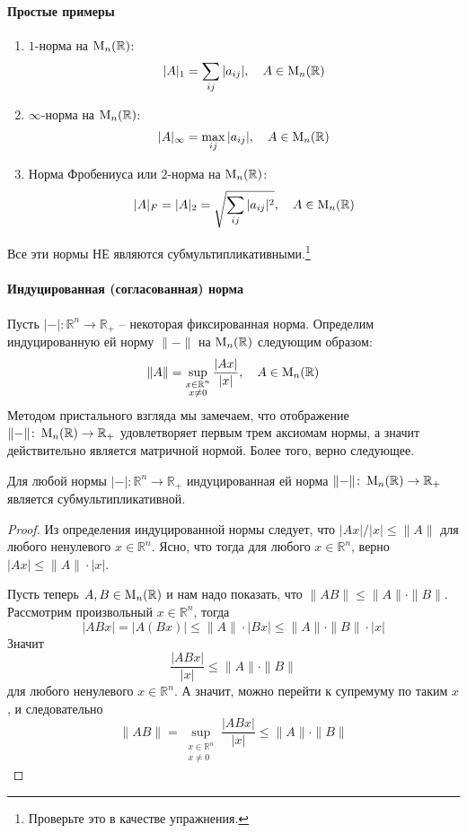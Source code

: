 \paragraph{Простые примеры}
\begin{enumerate}
\item $1$-норма на $\operatorname{M}_{n}(\mathbb R)$:
\[
|A|_1 = \sum_{ij}|a_{ij}|,\quad A\in\operatorname{M}_{n}(\mathbb R)
\]

\item $\infty$-норма на $\operatorname{M}_{n}(\mathbb R)$:
\[
|A|_\infty = \max_{ij}|a_{ij}|,\quad A\in\operatorname{M}_{n}(\mathbb R)
\]

\item Норма Фробениуса или $2$-норма на $\operatorname{M}_{n}(\mathbb R)$:
\[
|A|_F = |A|_2 = \sqrt{\sum_{ij}|a_{ij}|^2},\quad A\in\operatorname{M}_{n}(\mathbb R)
\]
\end{enumerate}


Все эти нормы НЕ являются субмультипликативными.\footnote{Проверьте это в качестве упражнения.}


\paragraph{Индуцированная (согласованная) норма}

Пусть $|{-}|\colon \mathbb R^n \to \mathbb R_+$ -- некоторая фиксированная норма. Определим индуцированную ей норму $\|{-}\|$ на $\operatorname{M}_{n}(\mathbb R)$ следующим образом:
\[
\|A\| = \sup_{\substack{x\in\mathbb R^n\\x\neq 0}}\frac{|Ax|}{|x|},\quad A\in\operatorname{M}_{n}(\mathbb R)
\]
Методом пристального взгляда мы замечаем, что отображение $\|{-}\|\colon \operatorname{M}_{n}(\mathbb R)\to \mathbb R_+$ удовлетворяет первым трем аксиомам нормы, а значит действительно является матричной нормой. Более того, верно следующее.

\begin{claim*}
Для любой нормы $|{-}|\colon \mathbb R^n\to \mathbb R_+$ индуцированная ей норма $\|{-}\|\colon \operatorname{M}_{n}(\mathbb R)\to \mathbb R_+$ является субмультипликативной.
\end{claim*}
\begin{proof}
Из определения индуцированной нормы следует, что $|Ax|/|x|\leqslant \|A\|$ для любого ненулевого $x\in\mathbb R^n$. Ясно, что тогда для любого $x\in\mathbb R^n$, верно $|Ax|\leqslant \|A\|\cdot|x|$. 

Пусть теперь $A, B\in\operatorname{M}_{n}(\mathbb R)$ и нам надо показать, что $\|AB\|\leqslant \|A\|\cdot \|B\|$. Рассмотрим произвольный $x\in\mathbb R^n$, тогда
\[
|ABx| = |A (Bx)|\leqslant \|A\|\cdot |Bx|\leqslant \|A\| \cdot \|B\|\cdot |x|
\]
Значит
\[
\frac{|ABx|}{|x|}\leqslant \|A\|\cdot\|B\|
\]
для любого ненулевого $x\in\mathbb R^n$. А значит, можно перейти к супремуму по таким $x$, и следовательно
\[
\|AB\| = \sup_{\substack{x\in\mathbb R^n\\x\neq 0}}\frac{|ABx|}{|x|}\leqslant \|A\|\cdot \|B\|
\]
\end{proof}

